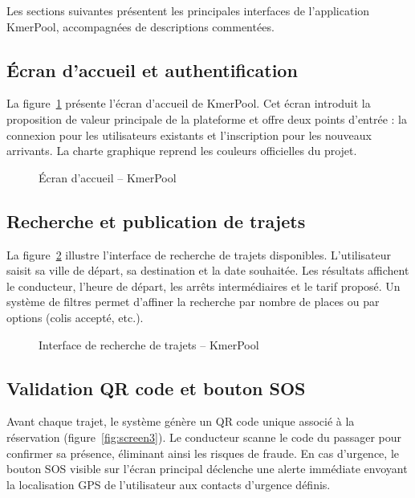 \documentclass[12pt, a4paper]{report}
\begin{document}
Les sections suivantes présentent les principales interfaces de l'application KmerPool,
accompagnées de descriptions commentées.

\subsection{Écran d'accueil et authentification}

La figure~\ref{fig:screen1} présente l'écran d'accueil de KmerPool. Cet écran introduit
la proposition de valeur principale de la plateforme et offre deux points d'entrée :
la connexion pour les utilisateurs existants et l'inscription pour les nouveaux arrivants.
La charte graphique reprend les couleurs officielles du projet.

\begin{figure}[H]
  \centering
  \caption{Écran d'accueil -- KmerPool}
  \label{fig:screen1}
\end{figure}

\subsection{Recherche et publication de trajets}

La figure~\ref{fig:screen2} illustre l'interface de recherche de trajets disponibles.
L'utilisateur saisit sa ville de départ, sa destination et la date souhaitée. Les résultats
affichent le conducteur, l'heure de départ, les arrêts intermédiaires et le tarif proposé.
Un système de filtres permet d'affiner la recherche par nombre de places ou par options
(colis accepté, etc.).

\begin{figure}[H]
  \centering
  \caption{Interface de recherche de trajets -- KmerPool}
  \label{fig:screen2}
\end{figure}

\subsection{Validation QR code et bouton SOS}

Avant chaque trajet, le système génère un \ac{QR} code unique associé à la réservation
(figure~\ref{fig:screen3}). Le conducteur scanne le code du passager pour confirmer
sa présence, éliminant ainsi les risques de fraude. En cas d'urgence, le bouton \ac{SOS}
visible sur l'écran principal déclenche une alerte immédiate envoyant la localisation
\ac{GPS} de l'utilisateur aux contacts d'urgence définis.
\end{document}
